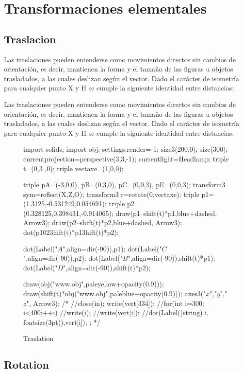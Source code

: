 \section{Transformaciones elementales}
\subsection{Traslacion}

Las traslaciones pueden entenderse como movimientos directos sin cambios de orientación, es decir, mantienen la forma y el tamaño de las figuras u objetos trasladados, a las cuales deslizan según el vector. Dado el carácter de isometría para cualquier punto X y H se cumple la siguiente identidad entre distancias:

Las traslaciones pueden entenderse como movimientos directos sin cambios de orientación, es decir, mantienen la forma y el tamaño de las figuras u objetos trasladados, a las cuales deslizan según el vector. Dado el carácter de isometría para cualquier punto X y H se cumple la siguiente identidad entre distancias:

\begin{figure}[!ht]
	\centering
	\begin{asy}
	import solids;
	import  obj;
	settings.render=-1;
	size3(200,0);
	size(300);
	currentprojection=perspective(3,3,-1);
	currentlight=Headlamp;
	triple t=(0,3 ,0);
	triple vectaxe=(1,0,0);

	triple pA=(-3,0,0), pB=(0,3,0), pC=(0,0,3), pE=(0,0,3);
	transform3 sym=reflect(X,Z,O);
	transform3 r=rotate(0,vectaxe);
	triple p1=(1.3125,-0.531249,0.054691);
	triple p2=(0.328125,0.398431,-0.914065);
	draw(p1--shift(t)*p1,blue+dashed, Arrow3);
	draw(p2--shift(t)*p2,blue+dashed, Arrow3);
	dot(p1^^p2^^shift(t)*p1^^shift(t)*p2);

	dot(Label("$A$",align=dir(-90)),p1);
	dot(Label("$C$",align=dir(-90)),p2);
	dot(Label("$B$",align=dir(-90)),shift(t)*p1);
	dot(Label("$D$",align=dir(-90)),shift(t)*p2);

	draw(obj("www.obj",paleyellow+opacity(0.9)));
	draw(shift(t)*obj("www.obj",paleblue+opacity(0.9)));
	axes3("$x$","$y$","$z$", Arrow3);
	/*
	//close(in);
	write(vert[334]);
	//for(int i=300; i<400;++i){
	//write(i);
	//write(vert[i]);
	//dot(Label((string) i, fontsize(3pt)),vert[i]);
	};
	*/
	\end{asy}
	\caption{Traslation}
\end{figure}

 \subsection{Rotation}

